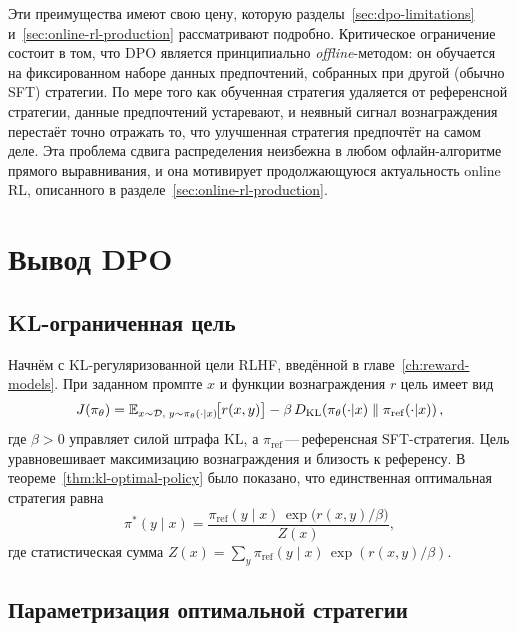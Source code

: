Эти преимущества имеют свою цену, которую разделы~\ref{sec:dpo-limitations} и~\ref{sec:online-rl-production} рассматривают подробно. Критическое ограничение состоит в том, что DPO является принципиально \emph{offline}-методом: он обучается на фиксированном наборе данных предпочтений, собранных при другой (обычно SFT) стратегии. По мере того как обученная стратегия удаляется от референсной стратегии, данные предпочтений устаревают, и неявный сигнал вознаграждения перестаёт точно отражать то, что улучшенная стратегия предпочтёт на самом деле. Эта проблема сдвига распределения неизбежна в любом офлайн-алгоритме прямого выравнивания, и она мотивирует продолжающуюся актуальность online RL, описанного в разделе~\ref{sec:online-rl-production}.

\section{Вывод DPO}
\label{sec:dpo-derivation}

\subsection{KL-ограниченная цель}

Начнём с KL-регуляризованной цели RLHF, введённой в главе~\ref{ch:reward-models}. При заданном промпте $x$ и функции вознаграждения $r$ цель имеет вид
\begin{equation}
\label{eq:dpo-rlhf-obj}
J(\pi_\theta) = \operatorname{\mathbb{E}}_{x \sim \mathcal{D},\; y \sim \pi_\theta(\cdot|x)}\!\bigl[r(x, y)\bigr]
- \beta\,D_{\mathrm{KL}}\!\left(\pi_\theta(\cdot|x)\;\|\;\pi_\mathrm{ref}(\cdot|x)\right),
\end{equation}
где $\beta > 0$ управляет силой штрафа KL, а $\pi_\mathrm{ref}$\,---\,референсная SFT-стратегия. Цель уравновешивает максимизацию вознаграждения и близость к референсу. В теореме~\ref{thm:kl-optimal-policy} было показано, что единственная оптимальная стратегия равна
\begin{equation}
\label{eq:dpo-optimal-policy}
\pi^*(y \mid x) = \frac{\pi_\mathrm{ref}(y \mid x)\,\exp\!\bigl(r(x, y)/\beta\bigr)}{Z(x)},
\end{equation}
где статистическая сумма $Z(x) = \sum_y \pi_\mathrm{ref}(y \mid x)\,\exp(r(x, y)/\beta)$.

\subsection{Параметризация оптимальной стратегии}


